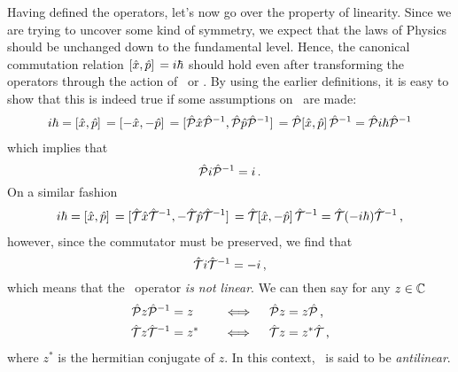         Having defined the operators, let's now go over the property of linearity. Since we are trying to uncover some kind of symmetry, we expect that the laws of Physics should be unchanged down to the fundamental level. Hence, the canonical commutation relation $\comm*{\hx}{\hp} = i \hbar$ should hold even after transforming the operators through the action of \hP\ or \hT. By using the earlier definitions, it is easy to show that this is indeed true if some assumptions on \hT\ are made:
        \begin{align*}
            i \hbar 
            = \comm*{\hx}{\hp} 
            = \comm*{-\hx}{-\hp} 
            = \comm*{\hP \hx \hP^{-1}}{\hP \hp \hP^{-1}} 
            = \hP \comm*{\hx}{\hp} \hP^{-1} 
            = \hP i \hbar \hP^{-1} 
        \end{align*}
        which implies that
        \begin{equation}
            \label{eq:PiP}
            \mathcal{\hat{P}} i \mathcal{\hat{P}}^{-1} = i
            \,\text{.}
        \end{equation}
        On a similar fashion
        \begin{align*}
            i \hbar
            = \comm*{\hx}{\hp} 
            = \comm*{\hT \hx \hT^{-1}}{-\hT \hp \hT^{-1}} 
            = \hT \comm*{\hx}{-\hp} \hT^{-1}
            = \hT \pqty{-i \hbar} \hT^{-1}
            \mycomma
        \end{align*}
        however, since the commutator must be preserved, we find that
        \begin{equation}
            \label{eq:TiT}
            \mathcal{\hat{T}} i \mathcal{\hat{T}}^{-1} = -i
            \,\text{,}
        \end{equation}
        which means that the \hT\ operator \emph{is not linear}. We can then say for any $z \in \mathbb{C}$ 
        \begin{alignat}{3}
            \label{eq:P-linear}
            \mathcal{\hat{P}} z \mathcal{\hat{P}}^{-1} &= z        
            &\quad\iff\quad 
            \mathcal{\hat{P}} z &= z \mathcal{\hat{P}}
            \,\text{,}
            \\
            \label{eq:T-antilinear}
            \mathcal{\hat{T}} z \mathcal{\hat{T}}^{-1} &= z^* 
            &\quad\iff\quad 
            \mathcal{\hat{T}} z &= z^* \mathcal{\hat{T}}
            \,\text{,}
        \end{alignat}
        where $z^*$ is the hermitian conjugate %
        of $z$. In this context, \hT\ is said to be \emph{antilinear}.

